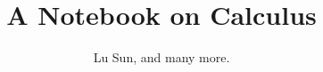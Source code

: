 



\makeindex



\frontmatter

\title{A Notebook on Calculus}
\author{Lu Sun, and many more.}

\maketitle


\tableofcontents


\listoffigures
\listoftables

\mainmatter






















\printindex


